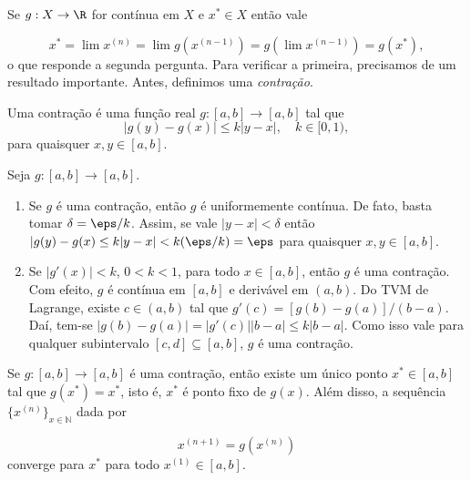 \documentclass{article}
\begin{document}
Se \(g: X \to \R\) for contínua em \(X\) e \(x^{*} \in X\) então vale

\begin{equation*}
    x^{*} = \lim x^{(n)} = \lim g(x^{(n-1)}) = g(\lim x^{(n-1)}) = g(x^{*}),
\end{equation*}
o que responde a segunda pergunta. Para verificar a primeira, precisamos de um resultado importante. Antes, definimos uma \emph{contração}.

\begin{defn}
    Uma contração é uma função real \(g: [a,b] \to [a,b]\) tal que
    \begin{equation}
        \vert g(y) - g(x) \vert \leq k \vert y - x \vert, \quad k \in [0,1),
    \end{equation}
    para quaisquer \(x, y \in [a,b]\).
\end{defn}

\begin{rem}
    Seja \(g: [a,b] \to [a,b]\).
    \begin{enumerate}
        \item [a.] Se \(g\) é uma contração, então \(g\) é uniformemente contínua. De fato, basta tomar \(\delta = \eps/k\). Assim, se vale \(\vert y-x \vert < \delta\) então \(\vert g(y)-g(x) \leq k\vert y-x \vert < k(\eps/k) = \eps\) para quaisquer \(x, y \in [a,b]\).
        \item [b.] Se \(\vert g'(x) \vert < k\), \(0<k<1\), para todo \(x \in [a,b]\), então \(g\) é uma contração. Com efeito, \(g\) é contínua em \([a,b]\) e derivável em \((a,b)\). Do TVM de Lagrange, existe \(c \in (a,b)\) tal que \(g'(c) = [g(b)-g(a)] / (b-a)\). Daí, tem-se \(\vert g(b)-g(a) \vert = \vert g'(c) \vert \vert b-a \vert \leq k \vert b-a \vert\). Como isso vale para qualquer subintervalo \([c,d] \subseteq [a,b]\), \(g\) é uma contração.
    \end{enumerate}
\end{rem}

\begin{thm} 
    Se \(g: [a,b] \to [a,b]\) é uma contração, então existe um único ponto \(x^{*} \in [a,b]\) tal que \(g(x^{*}) = x^{*}\), isto é, \(x^{*}\) é ponto fixo de \(g(x)\). Além disso, a sequência \(\{x^{(n)}\}_{x \in \mathbb{N}}\) dada por 

    \begin{equation*}
        x^{(n+1)} = g(x^{(n)})
    \end{equation*}
    converge para \(x^{*}\) para todo \(x^{(1)} \in [a,b]\).
\end{thm}
\end{document}
